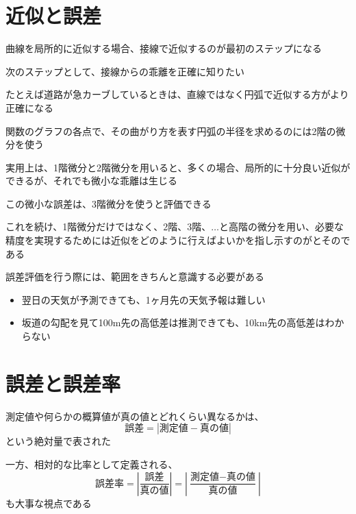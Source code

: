 \documentclass[../book_jiriki_calc]{subfiles}
\begin{document}
\section{近似と誤差}

曲線を局所的に近似する場合、接線で近似するのが最初のステップになる

次のステップとして、接線からの乖離を正確に知りたい

たとえば道路が急カーブしているときは、直線ではなく円弧で近似する方がより正確になる

関数のグラフの各点で、その曲がり方を表す円弧の半径を求めるのには2階の微分を使う

\br

実用上は、1階微分と2階微分を用いると、多くの場合、局所的に十分良い近似ができるが、それでも微小な乖離は生じる

この微小な誤差は、3階微分を使うと評価できる

これを続け、1階微分だけではなく、2階、3階、$\ldots$と高階の微分を用い、必要な精度を実現するためには近似をどのように行えばよいかを指し示すのがとそのである

\sectionline

誤差評価を行う際には、範囲をきちんと意識する必要がある
\begin{itemize}
  \item 翌日の天気が予測できても、1ヶ月先の天気予報は難しい
  \item 坂道の勾配を見て100m先の高低差は推測できても、10km先の高低差はわからない
\end{itemize}

\section{誤差と誤差率}

測定値や何らかの概算値が真の値とどれくらい異なるかは、
\begin{equation*}
  \text{誤差} = \left|\text{測定値} - \text{真の値}\right|
\end{equation*}
という絶対量で表された

\br

一方、相対的な比率として定義される、
\begin{equation*}
  \text{誤差率} = \left|\frac{\text{誤差}}{\text{真の値}}\right| = \left|\frac{\text{測定値} - \text{真の値}}{\text{真の値}}\right|
\end{equation*}
も大事な視点である

\br
\end{document}
